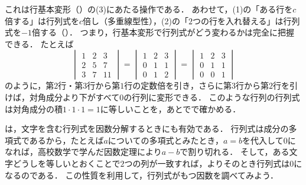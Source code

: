 これは行基本変形（）の(3)にあたる操作である．
あわせて，(1)の「ある行を$c$倍する」は行列式を$c$倍し（多重線型性），(2)の「$2$つの行を入れ替える」は行列式を$-1$倍する（）．
つまり，行基本変形で行列式がどう変わるかは完全に把握できる．
たとえば
\[
  \begin{vmatrix} 1 & 2 & 3 \\ 2 & 5 & 7 \\ 3 & 7 & 11 \end{vmatrix}
  = \begin{vmatrix} 1 & 2 & 3 \\ 0 & 1 & 1 \\ 0 & 1 & 2 \end{vmatrix}
  = \begin{vmatrix} 1 & 2 & 3 \\ 0 & 1 & 1 \\ 0 & 0 & 1 \end{vmatrix}
\]
のように，第$2$行・第$3$行から第$1$行の定数倍を引き，さらに第$3$行から第$2$行を引けば，対角成分より下がすべて$0$の行列に変形できる．
このような行列の行列式は対角成分の積$1 \cdot 1 \cdot 1 = 1$に等しいことを，あとでで確かめる．

は，文字を含む行列式を因数分解するときにも有効である．
行列式は成分の多項式であるから，たとえば$a$についての多項式とみたとき，$a = b$を代入して$0$になれば，高校数学で学んだ因数定理により$a - b$で割り切れる．
そして，ある文字どうしを等しいとおくことで$2$つの列が一致すれば，よりそのとき行列式は$0$になるのである．
この性質を利用して，行列式がもつ因数を調べてみよう．

